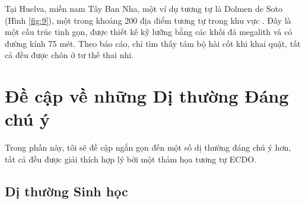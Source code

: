 \documentclass[10pt,twocolumn,letterpaper]{article}
\begin{document}
Tại Huelva, miền nam Tây Ban Nha, một ví dụ tương tự là Dolmen de Soto (Hình \ref{fig:9}), một trong khoảng 200 địa điểm tương tự trong khu vực \cite{72,32}. Đây là một cấu trúc tinh gọn, được thiết kế kỹ lưỡng bằng các khối đá megalith và có đường kính 75 mét. Theo báo cáo, chỉ tìm thấy tám bộ hài cốt khi khai quật, tất cả đều được chôn ở tư thế thai nhi.

\section{Đề cập về những Dị thường Đáng chú ý}

Trong phần này, tôi sẽ đề cập ngắn gọn đến một số dị thường đáng chú ý hơn, tất cả đều được giải thích hợp lý bởi một thảm họa tương tự ECDO.

\subsection{Dị thường Sinh học}
\end{document}
